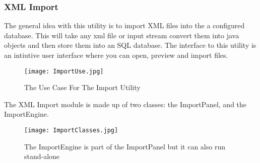 \subsubsection{XML Import}
\par
The general idea with this utility is to import XML files into the a configured database. This will take any xml file or input stream convert them into java objects and then store them into an SQL database. The interface to this utility is an intiutive user interface where you can open, preview and import files. 
\begin{figure}[h]
	\centering
		\texttt{[image: ImportUse.jpg]}
	\caption{The Use Case For The Import Utility}
	\label{fig:Import Use}
\end{figure}



\par
The XML Import module is made up of two classes: the ImportPanel, and the ImportEngine. 

\begin{figure}[h]
	\centering
		\texttt{[image: ImportClasses.jpg]}
	\caption{The ImportEngine is part of the ImportPanel but it can also run stand-alone}
	\label{fig:ImportClasses}
\end{figure}
